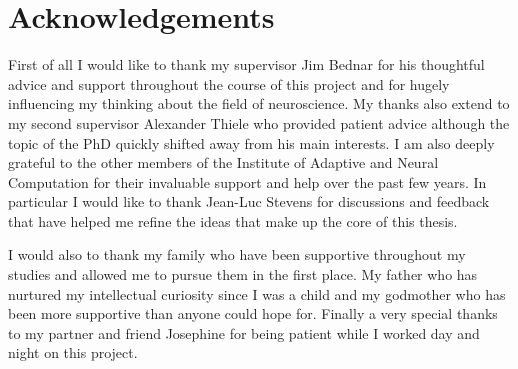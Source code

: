 


\begingroup

\let\clearpage\relax
\let\cleardoublepage\relax
\let\cleardoublepage\relax

\chapter*{Acknowledgements} %

First of all I would like to thank my supervisor Jim Bednar for his
thoughtful advice and support throughout the course of this project
and for hugely influencing my thinking about the field of
neuroscience. My thanks also extend to my second supervisor Alexander
Thiele who provided patient advice although the topic of the PhD
quickly shifted away from his main interests. I am also deeply
grateful to the other members of the Institute of Adaptive and Neural
Computation for their invaluable support and help over the past few
years. In particular I would like to thank Jean-Luc Stevens for
discussions and feedback that have helped me refine the ideas that
make up the core of this thesis.

I would also to thank my family who have been supportive throughout my
studies and allowed me to pursue them in the first place. My father
who has nurtured my intellectual curiosity since I was a child and my
godmother who has been more supportive than anyone could hope
for. Finally a very special thanks to my partner and friend Josephine
for being patient while I worked day and night on this project.

\endgroup
